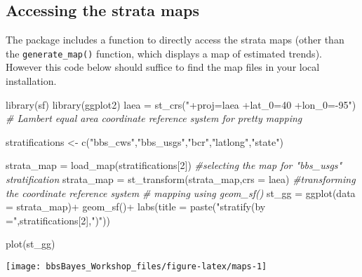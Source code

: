 \documentclass[
]{book}
\newenvironment{Shaded}{\begin{snugshade}}{\end{snugshade}}
\newcommand{\AttributeTok}[1]{\textcolor[rgb]{0.77,0.63,0.00}{#1}}
\newcommand{\CommentTok}[1]{\textcolor[rgb]{0.56,0.35,0.01}{\textit{#1}}}
\newcommand{\DecValTok}[1]{\textcolor[rgb]{0.00,0.00,0.81}{#1}}
\newcommand{\FunctionTok}[1]{\textcolor[rgb]{0.00,0.00,0.00}{#1}}
\newcommand{\NormalTok}[1]{#1}
\newcommand{\OtherTok}[1]{\textcolor[rgb]{0.56,0.35,0.01}{#1}}
\newcommand{\SpecialCharTok}[1]{\textcolor[rgb]{0.00,0.00,0.00}{#1}}
\newcommand{\StringTok}[1]{\textcolor[rgb]{0.31,0.60,0.02}{#1}}
\begin{document}
\hypertarget{accessing-the-strata-maps}{%
\subsection{Accessing the strata maps}\label{accessing-the-strata-maps}}

The package includes a function to directly access the strata maps (other than the \texttt{generate\_map()} function, which displays a map of estimated trends). However this code below should suffice to find the map files in your local installation.

\begin{Shaded}
\begin{Highlighting}[]
\FunctionTok{library}\NormalTok{(sf)}
\FunctionTok{library}\NormalTok{(ggplot2)}
\NormalTok{laea }\OtherTok{=} \FunctionTok{st\_crs}\NormalTok{(}\StringTok{"+proj=laea +lat\_0=40 +lon\_0={-}95"}\NormalTok{) }\CommentTok{\# Lambert equal area coordinate reference system for pretty mapping}


\NormalTok{stratifications }\OtherTok{\textless{}{-}} \FunctionTok{c}\NormalTok{(}\StringTok{"bbs\_cws"}\NormalTok{,}\StringTok{"bbs\_usgs"}\NormalTok{,}\StringTok{"bcr"}\NormalTok{,}\StringTok{"latlong"}\NormalTok{,}\StringTok{"state"}\NormalTok{)}

\NormalTok{strata\_map }\OtherTok{=} \FunctionTok{load\_map}\NormalTok{(stratifications[}\DecValTok{2}\NormalTok{]) }\CommentTok{\#selecting the map for "bbs\_usgs" stratification}
\NormalTok{strata\_map }\OtherTok{=} \FunctionTok{st\_transform}\NormalTok{(strata\_map,}\AttributeTok{crs =}\NormalTok{ laea) }\CommentTok{\#transforming the coordinate reference system}
\CommentTok{\# mapping using geom\_sf()}
\NormalTok{st\_gg }\OtherTok{=} \FunctionTok{ggplot}\NormalTok{(}\AttributeTok{data =}\NormalTok{ strata\_map)}\SpecialCharTok{+}
\FunctionTok{geom\_sf}\NormalTok{()}\SpecialCharTok{+}
\FunctionTok{labs}\NormalTok{(}\AttributeTok{title =} \FunctionTok{paste}\NormalTok{(}\StringTok{"stratify(by ="}\NormalTok{,stratifications[}\DecValTok{2}\NormalTok{],}\StringTok{")"}\NormalTok{))}

\FunctionTok{plot}\NormalTok{(st\_gg)}
\end{Highlighting}
\end{Shaded}

\begin{center}\texttt{[image: bbsBayes\_Workshop\_files/figure-latex/maps-1]} \end{center}
\end{document}
